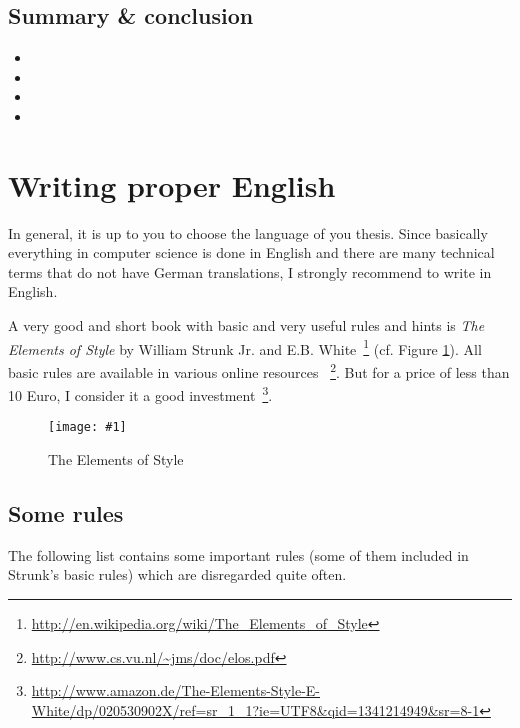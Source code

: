 \documentclass{article}
\newcommand{\img}[4]{
	\begin{figure}[!htb]
		\centering
		\texttt{[image: \#1]}
		\caption{#3}
		\label{#2}
	\end{figure}
}
\begin{document}
\subsection{Summary \& conclusion}
\begin{itemize}
	\item 
	\item 
	\item 
	\item 
\end{itemize}













\section{Writing proper English}

In general, it is up to you to choose the language of you thesis.
Since basically everything in computer science is done in English and there are many technical terms that do not have German translations, I strongly recommend to write in English.

A very good and short book with basic and very useful rules and hints is \emph{The Elements of Style} by William Strunk Jr. and E.B. White~\footnote{\url{http://en.wikipedia.org/wiki/The_Elements_of_Style}} (cf. Figure \ref{fig:elements}).
All basic rules are available in various online resources~
\footnote{\url{http://www.cs.vu.nl/~jms/doc/elos.pdf}}.
But for a price of less than 10 Euro, I consider it a good investment~\footnote{\url{http://www.amazon.de/The-Elements-Style-E-White/dp/020530902X/ref=sr_1_1?ie=UTF8&qid=1341214949&sr=8-1}}.

\img{elements-of-style}{fig:elements}{The Elements of Style}{0.2}

\subsection{Some rules}

The following list contains some important rules (some of them included in Strunk's basic rules) which are disregarded quite often.
\end{document}
